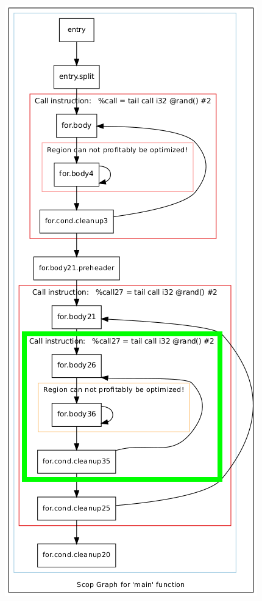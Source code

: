 \documentclass[aspectratio=169, xcolor=dvipsnames]{beamer}
\begin{document}
{\begin{frame}
        \includegraphics[height=1.2\textheight]{gfx/matmulScops(5).png}
    \end{frame}
    \begin{frame}
        \vspace*{-1.5cm}
        \centering

\end{frame}}
\end{document}
